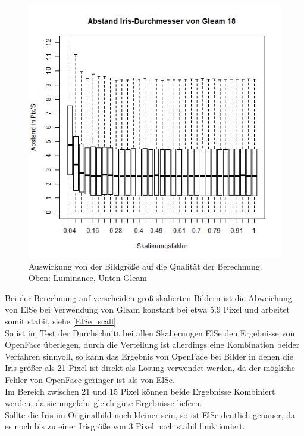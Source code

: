 \begin{figure}
	\includegraphics[width=0.32\linewidth]{Eye_Img_Box/Gleam_Radius_I_18}
	\caption{Auswirkung von der Bildgröße auf die Qualität der Berechnung.\\ Oben: Luminance, Unten Gleam}
	\label{ElSe_scall}
\end{figure}
Bei der Berechnung auf verscheiden groß skalierten Bildern ist die Abweichung von ElSe bei Verwendung von Gleam konstant bei etwa 5.9 Pixel und arbeitet somit stabil, siehe \autoref{ElSe_scall}.\\
So ist im Test der Durchschnitt bei allen Skalierungen ElSe den Ergebnisse von OpenFace überlegen, durch die Verteilung ist allerdings eine Kombination beider Verfahren sinnvoll, so kann das Ergebnis von OpenFace bei Bilder in denen die Iris größer als 21 Pixel ist direkt als Lösung verwendet werden, da der mögliche Fehler von OpenFace geringer ist als von ElSe.\\
Im Bereich zwischen 21 und 15 Pixel können beide Ergebnisse Kombiniert werden, da sie ungefähr gleich gute Ergebnisse liefern.\\
Sollte die Iris im Originalbild noch kleiner sein, so ist ElSe deutlich genauer, da es noch bis zu einer Irisgröße von 3 Pixel noch stabil funktioniert.
